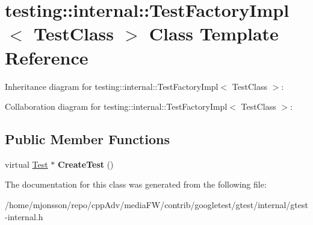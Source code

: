\hypertarget{classtesting_1_1internal_1_1TestFactoryImpl}{}\section{testing\+:\+:internal\+:\+:Test\+Factory\+Impl$<$ Test\+Class $>$ Class Template Reference}
\label{classtesting_1_1internal_1_1TestFactoryImpl}


Inheritance diagram for testing\+:\+:internal\+:\+:Test\+Factory\+Impl$<$ Test\+Class $>$\+:


Collaboration diagram for testing\+:\+:internal\+:\+:Test\+Factory\+Impl$<$ Test\+Class $>$\+:
\subsection*{Public Member Functions}
\begin{DoxyCompactItemize}
\item 
\mbox{\label{classtesting_1_1internal_1_1TestFactoryImpl_a8860c89bdb06450a5d5e8137ebd9d775}} 
virtual \hyperlink{classtesting_1_1Test}{Test} $\ast$ {\bfseries Create\+Test} ()
\end{DoxyCompactItemize}


The documentation for this class was generated from the following file\+:\begin{DoxyCompactItemize}
\item 
/home/mjonsson/repo/cpp\+Adv/media\+F\+W/contrib/googletest/gtest/internal/gtest-\/internal.\+h\end{DoxyCompactItemize}
